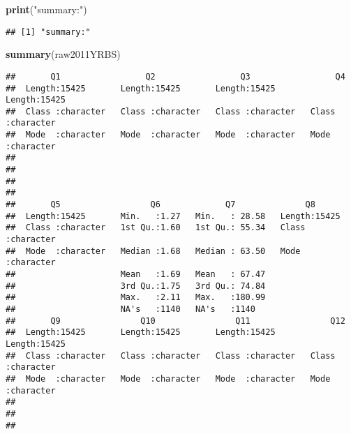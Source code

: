 \documentclass[
]{article}
\newenvironment{Shaded}{\begin{snugshade}}{\end{snugshade}}
\newcommand{\FunctionTok}[1]{\textcolor[rgb]{0.13,0.29,0.53}{\textbf{#1}}}
\newcommand{\NormalTok}[1]{#1}
\newcommand{\StringTok}[1]{\textcolor[rgb]{0.31,0.60,0.02}{#1}}
\begin{document}
\begin{Shaded}
\begin{Highlighting}[]
\FunctionTok{print}\NormalTok{(}\StringTok{"summary:"}\NormalTok{)}
\end{Highlighting}
\end{Shaded}

\begin{verbatim}
## [1] "summary:"
\end{verbatim}

\begin{Shaded}
\begin{Highlighting}[]
\FunctionTok{summary}\NormalTok{(raw2011YRBS)}
\end{Highlighting}
\end{Shaded}

\begin{verbatim}
##       Q1                 Q2                 Q3                 Q4           
##  Length:15425       Length:15425       Length:15425       Length:15425      
##  Class :character   Class :character   Class :character   Class :character  
##  Mode  :character   Mode  :character   Mode  :character   Mode  :character  
##                                                                             
##                                                                             
##                                                                             
##                                                                             
##       Q5                  Q6             Q7              Q8           
##  Length:15425       Min.   :1.27   Min.   : 28.58   Length:15425      
##  Class :character   1st Qu.:1.60   1st Qu.: 55.34   Class :character  
##  Mode  :character   Median :1.68   Median : 63.50   Mode  :character  
##                     Mean   :1.69   Mean   : 67.47                     
##                     3rd Qu.:1.75   3rd Qu.: 74.84                     
##                     Max.   :2.11   Max.   :180.99                     
##                     NA's   :1140   NA's   :1140                       
##       Q9                Q10                Q11                Q12           
##  Length:15425       Length:15425       Length:15425       Length:15425      
##  Class :character   Class :character   Class :character   Class :character  
##  Mode  :character   Mode  :character   Mode  :character   Mode  :character  
##                                                                             
##                                                                             
##                                                                             

\end{verbatim}
\end{document}

